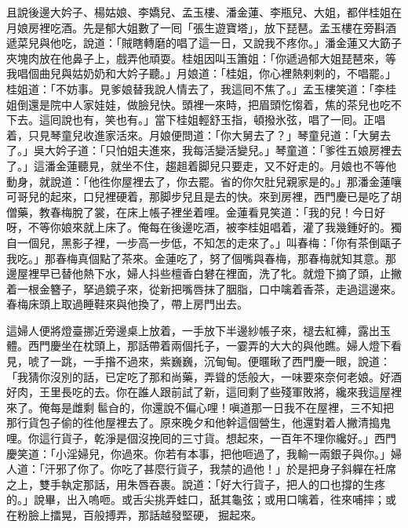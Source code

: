 且說後邊大妗子、楊姑娘、李嬌兒、孟玉樓、潘金蓮、李瓶兒、大姐，都伴桂姐在月娘房裡吃酒。先是郁大姐數了一囘「張生遊寶塔」，放下琵琶。孟玉樓在旁斟酒遞菜兒與他吃，說道：「賊瞎轉磨的唱了這一日，又說我不疼你。」潘金蓮又大筯子夾塊肉放在他鼻子上，戲弄他頑耍。桂姐因叫玉簫姐：「你遞過郁大姐琵琶來，等我唱個曲兒與姑奶奶和大妗子聽。」月娘道：「桂姐，你心裡熱剌剌的，不唱罷。」桂姐道：「不妨事。見爹娘替我說人情去了，我這囘不焦了。」孟玉樓笑道：「李桂姐倒還是院中人家娃娃，做臉兒快。頭裡一來時，把眉頭忔㥮着，焦的茶兒也吃不下去。{}這囘說也有，笑也有。」當下桂姐輕舒玉指，頓撥氷弦，唱了一囘。正唱着，只見琴童兒收進家活來。月娘便問道：「你大舅去了？」琴童兒道：「大舅去了。」吳大妗子道：「只怕姐夫進來，我每活變活變兒。」琴童道：「爹徃五娘房裡去了。」這潘金蓮聽見，就坐不住，趨趄着脚兒只要走，又不好走的。{}月娘也不等他動身，就說道：「他徃你屋裡去了，你去罷。省的你欠肚兒親家是的。」{}那潘金蓮嚷可哥兒的起來，口兒裡硬着，那脚步兒且是去的快。來到房裡，西門慶已是吃了胡僧藥，教春梅脫了裳，在床上帳子裡坐着哩。金蓮看見笑道：「我的兒！今日好呀，不等你娘來就上床了。俺每在後邊吃酒，被李桂姐唱着，灌了我幾鍾好的。獨自一個兒，黑影子裡，一步高一步低，不知怎的走來了。」{}叫春梅：「你有茶倒甌子我吃。」那春梅真個點了茶來。金蓮吃了，努了個嘴與春梅，那春梅就知其意。{}那邊屋裡早已替他熱下水，婦人抖些檀香白礬在裡面，{}洗了牝。就燈下摘了頭，止撇着一根金簪子，拏過鏡子來，從新把嘴唇抹了胭脂，口中噙着香茶，走過這邊來。春梅床頭上取過睡鞋來與他換了，帶上房門出去。

這婦人便將燈臺挪近旁邊桌上放着，一手放下半邊紗帳子來，褪去紅褲，露出玉體。西門慶坐在枕頭上，那話帶着兩個托子，一霎弄的大大的與他瞧。婦人燈下看見，唬了一跳，一手揝不過來，紫巍巍，沉甸甸。便暱瞅了西門慶一眼，說道：「我猜你沒別的話，已定吃了那和尚藥，{}弄聳的恁般大，一味要來奈何老娘。好酒好肉，王里長吃的去。你在誰人跟前試了新，這囘剩了些殘軍敗將，{}纔來我這屋裡來了。俺每是雌剩𩫻䯲㒲的，你還說不偏心哩！嗔道那一日我不在屋裡，三不知把那行貨包子偷的徃他屋裡去了。原來晚夕和他幹這個營生，他還對着人撇清搗鬼哩。你這行貨子，乾淨是個沒挽囘的三寸貨。想起來，一百年不理你纔好。」西門慶笑道：「小淫婦兒，你過來。你若有本事，把他咂過了，我輸一兩銀子與你。」婦人道：「汗邪了你了。你吃了甚麼行貨子，我禁的過他！」於是把身子斜軃在衽席之上，雙手執定那話，用朱唇吞裹。說道：「好大行貨子，把人的口也撐的生疼的。」說畢，出入嗚咂。或舌尖挑弄蛙口，舐其龜弦；或用口噙着，徃來哺摔；或在粉臉上擂晃，百般搏弄，那話越發堅硬，𢳥掘起來。

